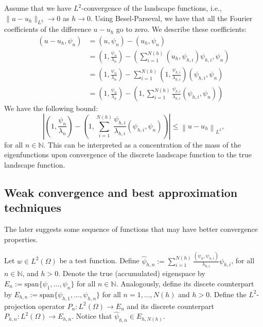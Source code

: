 Assume that we have \(L^2\)-convergence of the landscape functions, i.e., \(\lVert u - u_h \rVert_{L^2} \to 0\) as \(h \to 0\).
Using Besel-Parseval, we have that all the Fourier coefficients of the difference \(u - u_h\) go to zero.
We describe these coefficients:
\begin{align*}
    \label{eq:fourier}
    (u - u_h, \psi_n) & = (u, \psi_n) - (u_h, \psi_n)\\
    & = \left(1, \frac{\psi_n}{\lambda_n}\right) -
    \left(\sum_{i=1}^{N(h)} (u_h, \psi_{h, i}) \psi_{h, i}, \psi_n\right) \\
    & = \left(1, \frac{\psi_n}{\lambda_n}\right) - \sum_{i=1}^{N(h)}  \left(1, \frac{\psi_{h, i}}{\lambda_{h, i}} \right) (\psi_{h, i}, \psi_n) \\
    & = \left(1, \frac{\psi_n}{\lambda_n}\right) - \left(1, \sum_{i=1}^{N(h)} \frac{\psi_{h, i}}{\lambda_{h, i}} (\psi_{h, i}, \psi_n)\right)
\end{align*}
We have the following bound:
\begin{equation}
    \label{eq:fourier_bound}
    \left\lvert
    \left(1, \frac{\psi_n}{\lambda_n}\right) - \left(1, \sum_{i=1}^{N(h)} \frac{\psi_{h, i}}{\lambda_{h, i}} (\psi_{h, i}, \psi_n)\right)
    \right\rvert
\leq \left\lVert u - u_h \right\rVert_{L^2},
\end{equation}
for all \(n \in \mathbb{N}\).
This can be interpreted as a concentration of the mass of the eigenfunctions upon convergence of the discrete landscape function to the true landscape function.

\subsection{Weak convergence and best approximation techniques}

The later suggests some sequence of functions that may have better convergence properties.

Let \(w \in L^2(\Omega)\) be a test function.
Define \(\hat \psi_{h, n} := \sum_{i=1}^{N(h)} \frac{(\psi_n, \psi_{h, i})}{\lambda_{h, i}} \psi_{h, i}\), for all \(n \in \mathbb{N}\), and \(h > 0\).
Denote the true (accumulated) eigenspace by \( E_n := \text{span}\{\psi_1, \ldots, \psi_n\}\) for all \(n \in \mathbb{N}\).
Analogously, define its discete counterpart by \(E_{h, n} := \text{span}\{\psi_{h, 1}, \ldots, \psi_{h, n}\}\) for all \(n = 1, \dots, N(h)\) and \(h > 0\).
Define the \(L^2\)-projection operator \(P_n: L^2(\Omega) \to E_n\) and its discrete counterpart \(P_{h, n}: L^2(\Omega) \to E_{h, n}\).
Notice that \(\hat \psi_{h, n} \in E_{h, N(h)}\).


